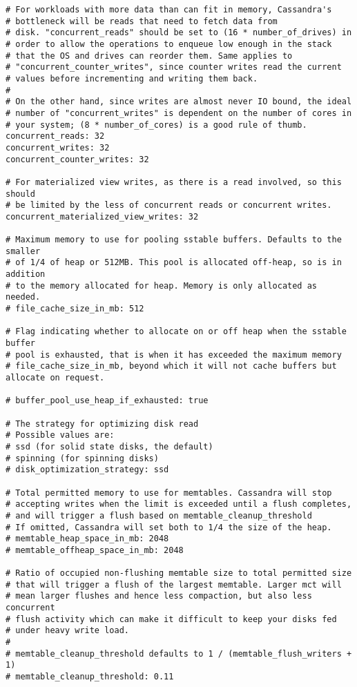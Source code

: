 \begin{verbatim}
# For workloads with more data than can fit in memory, Cassandra's
# bottleneck will be reads that need to fetch data from
# disk. "concurrent_reads" should be set to (16 * number_of_drives) in
# order to allow the operations to enqueue low enough in the stack
# that the OS and drives can reorder them. Same applies to
# "concurrent_counter_writes", since counter writes read the current
# values before incrementing and writing them back.
#
# On the other hand, since writes are almost never IO bound, the ideal
# number of "concurrent_writes" is dependent on the number of cores in
# your system; (8 * number_of_cores) is a good rule of thumb.
concurrent_reads: 32
concurrent_writes: 32
concurrent_counter_writes: 32

# For materialized view writes, as there is a read involved, so this should
# be limited by the less of concurrent reads or concurrent writes.
concurrent_materialized_view_writes: 32

# Maximum memory to use for pooling sstable buffers. Defaults to the smaller
# of 1/4 of heap or 512MB. This pool is allocated off-heap, so is in addition
# to the memory allocated for heap. Memory is only allocated as needed.
# file_cache_size_in_mb: 512

# Flag indicating whether to allocate on or off heap when the sstable buffer
# pool is exhausted, that is when it has exceeded the maximum memory
# file_cache_size_in_mb, beyond which it will not cache buffers but allocate on request.

# buffer_pool_use_heap_if_exhausted: true

# The strategy for optimizing disk read
# Possible values are:
# ssd (for solid state disks, the default)
# spinning (for spinning disks)
# disk_optimization_strategy: ssd

# Total permitted memory to use for memtables. Cassandra will stop
# accepting writes when the limit is exceeded until a flush completes,
# and will trigger a flush based on memtable_cleanup_threshold
# If omitted, Cassandra will set both to 1/4 the size of the heap.
# memtable_heap_space_in_mb: 2048
# memtable_offheap_space_in_mb: 2048

# Ratio of occupied non-flushing memtable size to total permitted size
# that will trigger a flush of the largest memtable. Larger mct will
# mean larger flushes and hence less compaction, but also less concurrent
# flush activity which can make it difficult to keep your disks fed
# under heavy write load.
#
# memtable_cleanup_threshold defaults to 1 / (memtable_flush_writers + 1)
# memtable_cleanup_threshold: 0.11


\end{verbatim}
